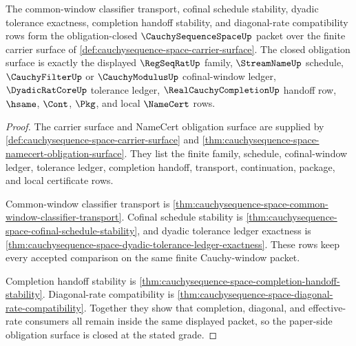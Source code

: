 \begin{theorem}
\label{thm:cauchysequence-space-obligation-closure-package}
The common-window classifier transport, cofinal schedule stability, dyadic tolerance exactness, completion handoff stability, and diagonal-rate compatibility rows form the obligation-closed $\CauchySequenceSpaceUp$ packet over the finite carrier surface of \autoref{def:cauchysequence-space-carrier-surface}. The closed obligation surface is exactly the displayed $\RegSeqRatUp$ family, $\StreamNameUp$ schedule, $\CauchyFilterUp$ or $\CauchyModulusUp$ cofinal-window ledger, $\DyadicRatCoreUp$ tolerance ledger, $\RealCauchyCompletionUp$ handoff row, $\hsame$, $\Cont$, $\Pkg$, and local $\NameCert$ rows.
\end{theorem}
\begin{proof}
The carrier surface and NameCert obligation surface are supplied by \autoref{def:cauchysequence-space-carrier-surface} and \autoref{thm:cauchysequence-space-namecert-obligation-surface}. They list the finite family, schedule, cofinal-window ledger, tolerance ledger, completion handoff, transport, continuation, package, and local certificate rows.

Common-window classifier transport is \autoref{thm:cauchysequence-space-common-window-classifier-transport}. Cofinal schedule stability is \autoref{thm:cauchysequence-space-cofinal-schedule-stability}, and dyadic tolerance ledger exactness is \autoref{thm:cauchysequence-space-dyadic-tolerance-ledger-exactness}. These rows keep every accepted comparison on the same finite Cauchy-window packet.

Completion handoff stability is \autoref{thm:cauchysequence-space-completion-handoff-stability}. Diagonal-rate compatibility is \autoref{thm:cauchysequence-space-diagonal-rate-compatibility}. Together they show that completion, diagonal, and effective-rate consumers all remain inside the same displayed packet, so the paper-side obligation surface is closed at the stated grade.
\end{proof}

